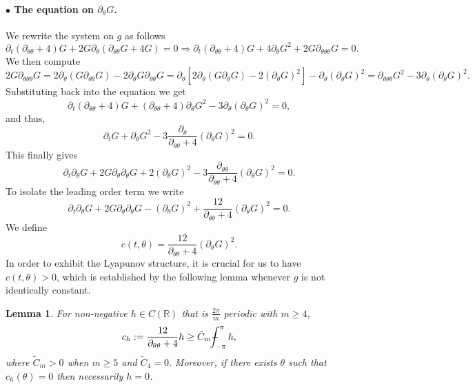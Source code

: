 \documentclass[10pt]{article}
\numberwithin{equation}{section}
\theoremstyle{plain}
\newtheorem{lemma}{Lemma}[section]
\theoremstyle{definition}
\def\Xint#1{\mathchoice
{\XXint\displaystyle\textstyle{#1}}%
{\XXint\textstyle\scriptstyle{#1}}%
{\XXint\scriptstyle\scriptscriptstyle{#1}}%
{\XXint\scriptscriptstyle\scriptscriptstyle{#1}}%
\!\int}
\def\XXint#1#2#3{{\setbox0=\hbox{$#1{#2#3}{\int}$ }
\vcenter{\hbox{$#2#3$ }}\kern-.6\wd0}}
\def\dashint{\Xint-}
\numberwithin{equation}{section}
\begin{document}
\paragraph{\textbf{$\bullet$ The equation on $\partial_\theta G$.}}
We rewrite the system on $g$ as follows
\[
\partial_t (\partial_{\theta \theta}+4)G+2G\partial_\theta (\partial_{\theta \theta}G+4G)=0\Rightarrow \partial_t (\partial_{\theta \theta}+4)G+4\partial_\theta G^2+2G \partial_{\theta \theta \theta}G=0.
\]
We then compute 
\[
2G \partial_{\theta \theta \theta}G=2\partial_{\theta}(G\partial_{\theta \theta}G)-2\partial_{\theta}G\partial_{\theta \theta}G=\partial_{\theta}[2\partial_\theta(G\partial_{\theta }G)-2(\partial_{\theta }G)^2]-\partial_\theta(\partial_{\theta}G)^2=\partial_{\theta \theta \theta}G^2-3\partial_\theta(\partial_{\theta}G)^2.
\]
Substituting back into the equation we get
\[
\partial_t (\partial_{\theta \theta}+4)G+(\partial_{\theta \theta}+4)\partial_\theta G^2-3\partial_\theta (\partial_\theta G)^2=0,
\]
and thus,
\[
\partial_t G+\partial_\theta G^2-3\frac{\partial_\theta}{\partial_{\theta \theta}+4} (\partial_\theta G)^2=0.
\]
This finally gives
\[
\partial_t \partial_\theta G+2G\partial_\theta \partial_\theta G+2(\partial_\theta G)^2-3\frac{\partial_{\theta\theta}}{\partial_{\theta \theta}+4} (\partial_\theta G)^2=0.
\]
To isolate the leading order term we write
\[
\partial_t \partial_\theta G+2G\partial_\theta \partial_\theta G-(\partial_\theta G)^2+\frac{12}{\partial_{\theta \theta}+4} (\partial_\theta G)^2=0.
\]
We define
\[
c(t,\theta)=\frac{12}{\partial_{\theta \theta}+4} (\partial_\theta G)^2.
\]
 In order to exhibit the Lyapunov structure, it is crucial for us to have $c(t,\theta) >0$, which is established by the following lemma whenever $g$ is not identically constant. 
\begin{lemma}\label{elliptic estimate}
For non-negative $h\in C(\mathbb{R})$ that is $\frac{2\pi}{m}$ periodic with $m\geq 4$,
\[
c_h:=\frac{12}{\partial_{\theta \theta}+4}h\geq \tilde C_m \dashint_{-\pi}^\pi h,
\] where $\tilde C_m>0$ when $m\geq 5$ and $\tilde C_4=0.$
Moreover, if there exists $\theta$ such that $c_h(\theta)=0$ then necessarily $h=0$.
\end{lemma}
\end{document}
